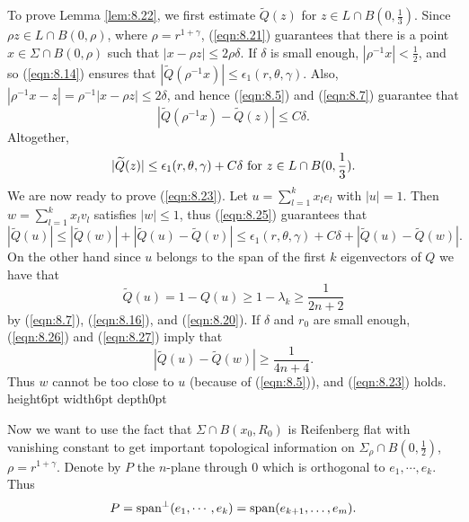 \documentclass[12pt,leqno]{article}
\newcommand\qed{\hfill\vrule height6pt width6pt depth0pt}
\theoremstyle{plain}
\newenvironment{proof}{\medskip\noindent{\bf Proof: }\rmfamily}{\medskip}
\numberwithin{equation}{section}
\begin{document}
\begin{proof}
To prove Lemma \ref{lem:8.22}, we first estimate $\widetilde Q(z)$ for $z\in
L\cap B(0,\frac{1}{3})$. Since $\rho z\in L\cap B(0,\rho)$, where $\rho=r^{1+\gamma}$, (\ref{eqn:8.21}) guarantees that there is a point $x\in\Sigma\cap
B(0,\rho)$ such that $|x-\rho z|\le 2\rho\delta$. If $\delta$ is small
enough, $|\rho^{-1}x|<\frac{1}{2}$, and so (\ref{eqn:8.14}) ensures that
$|\widetilde Q(\rho^{-1}x)|\le \epsilon_1(r,\theta,\gamma)$.
Also, $|\rho^{-1}x-z|=\rho^{-1}|x-\rho z|\le 2\delta$, and hence (\ref{eqn:8.5}) and (\ref{eqn:8.7})
guarantee that
\begin{equation}\label{eqn:8.24}
|\widetilde Q(\rho^{-1}x)-\widetilde Q(z)|\le C\delta.
\end{equation}
Altogether,
\begin{equation}\label{eqn:8.25}
|\widetilde Q(z)|\le \epsilon_1(r,\theta,\gamma)+
C\delta\hbox{ for }z\in L\cap
B(0,\frac{1}{3}).
\end{equation}
We are now ready to prove (\ref{eqn:8.23}).
Let $u=\sum_{l=1}^k x_l e_l$ with $|u|=1$. Then $w=\sum_{l=1}^k x_l v_l$
satisfies $|w|\le 1$, thus (\ref{eqn:8.25})
guarantees that
\begin{equation}\label{eqn:8.26}
|\widetilde Q(u)| \le  |\widetilde Q(w)|+|\widetilde Q(u)-\widetilde
Q(v)|
 \le  \epsilon_1(r,\theta, \gamma)+C\delta +
|\widetilde Q(u)-\widetilde Q(w)|.
\end{equation}
On the other hand since $u$ belongs to the span of the first $k$ eigenvectors
of $Q$ we have that
\begin{equation}\label{eqn:8.27}
\widetilde Q(u)=1-Q(u)\ge 1-\lambda_k\ge \frac{1}{2n+2}
\end{equation}
by (\ref{eqn:8.7}), (\ref{eqn:8.16}), and (\ref{eqn:8.20}). If $\delta$ and
$r_0$ are small enough, (\ref{eqn:8.26}) and (\ref{eqn:8.27}) imply that
\begin{equation}\label{eqn:8.28}
|\widetilde Q(u)-\widetilde Q(w)|\ge \frac{1}{4n+4}.
\end{equation}
Thus $w$ cannot be too close to $u$ (because of (\ref{eqn:8.5})), and
(\ref{eqn:8.23}) holds. \qed
\end{proof}


\noindent Now we want to use the fact that $\Sigma\cap B(x_0, R_0)$
is Reifenberg flat with
vanishing constant to get important topological information on
$\Sigma_\rho\cap B(0, \frac{1}{2})$, $\rho=r^{1+\gamma}$. Denote by $P$
the $n$-plane through 0 which is orthogonal to $e_1,\cdots, e_k$. Thus
\begin{equation}\label{eqn:8.29}
P={\rm span}^\perp(e_1, \cdots, e_k)=\mathrm{span}(e_{k+1},\ldots, e_m).
\end{equation}
\end{document}
